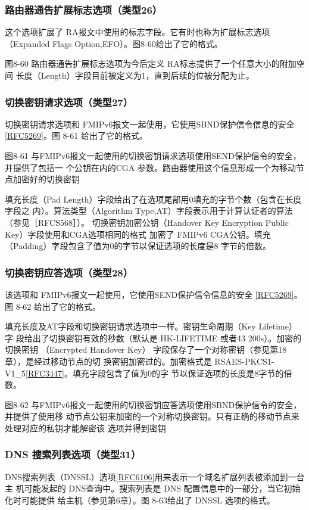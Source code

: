 \subsubsection{路由器通告扩展标志选项（类型26）}
这个选项扩展了 RA报文中使用的标志字段。它有时也称为扩展标志选项（Expanded
Flags Option,EFO）。图8-60给出了它的格式。

图8-60 路由器通告扩展标志选项为今后定义 RA标志提供了一个任意大小的附加空间
长度（Length）字段目前被定义为1，直到后续的位被分配为止。

\subsubsection{切换密钥请求选项（类型27）}
切换密钥请求选项和 FMIPv6报文一起使用，它使用SBND保护信令信息的安全
\href{https://www.rfc-editor.org/rfc/rfc5269}{[RFC5269]}。图 8-61 给出了它的格式。

图8-61 与FMIPv6报文一起使用的切换密钥请求选项使用SEND保护信令的安全，并提供了包括一
个公钥在内的CGA 参数。路由器使用这个信息形成一个为移动节点加密好的切换密钥

填充长度（Pad Length）字段给出了在选项尾部用0填充的字节个数（包含在长度字段之
内）。算法类型（Algorithm Type,AT）字段表示用于计算认证者的算法（参见［RFCS568］）。
切换密钥加密公钥（Handover Key Encryption Public Key）字段使用和CGA选项相同的格式
加密了 FMIPv6 CGA公钥。填充（Padding）字段包含了值为0的字节以保证选项的长度是8
字节的倍数。

\subsubsection{切换密钥应答选项（类型28）}
该选项和 FMIPv6报文一起使用，它使用SEND保护信令信息的安全
\href{https://www.rfc-editor.org/rfc/rfc5269}{[RFC5269]}。
图 8-62 给出了它的格式。

填充长度及AT字段和切换密钥请求选项中一样。密钥生命周期（Key Lifetime）字
段给出了切换密钥有效的秒数（默认是 HK-LIFETIME 或者43 200s）。加密的切换密钥
（Encrypted Handover Key） 字段保存了一个对称密钥（参见第18章），是经过移动节点的切
换密钥加密过的。加密格式是
RSAES-PKCS1-V1\_5\href{https://www.rfc-editor.org/rfc/rfc3447}{[RFC3447]}。填充字段包含了值为0的字
节以保证选项的长度是8字节的倍数。

图8-62 与FMIPv6报文一起使用的切换密钥应答选项使用SBND保护信令的安全，并提供了使用移
动节点公钥来加密的一个对称切换密钥。只有正确的移动节点来处理对应的私钥才能解密该
选项并得到密钥

\subsubsection{DNS 搜索列表选项（类型31）}
DNS搜索列表（DNSSL）选项\href{https://www.rfc-editor.org/rfc/rfc6106}{[RFC6106]}用来表示一个域名扩展列表被添加到一台主
机可能发起的 DNS查询中。搜索列表是 DNS 配置信息中的一部分，当它初始化时可能提供
给主机（参见第6章）。图 8-63给出了 DNSSL 选项的格式。

